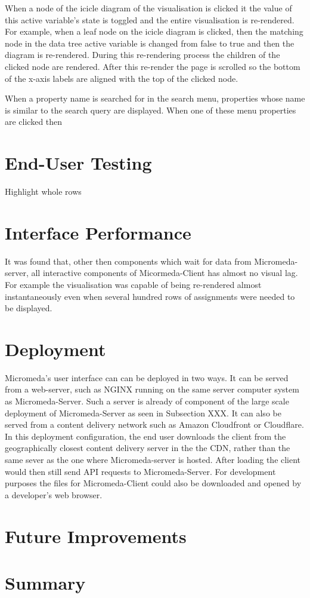 When a node of the icicle diagram of the visualisation is clicked it the value of this active variable's state is toggled and the entire visualisation is re-rendered. For example, when a leaf node on the icicle diagram is clicked, then the matching node in the data tree active variable is changed from false to true and then the diagram is re-rendered. During this re-rendering process the children of the clicked node are rendered. After this re-render the page is scrolled so the bottom of the x-axis labels are aligned with the top of the clicked node.

When a property name is searched for in the search menu, properties whose name is similar to the search query are displayed. When one of these menu properties are clicked then 

\section{End-User Testing}

Highlight whole rows

\section{Interface Performance}

It was found that, other then components which wait for data from Micromeda-server, all interactive components of Micormeda-Client has almost no visual lag. For example the visualisation was capable of being re-rendered almost instantaneously even when several hundred rows of assignments were needed to be displayed.

\section{Deployment}

Micromeda's user interface can can be deployed in two ways. It can be served from a web-server, such as NGINX running on the same server computer system as Micromeda-Server. Such a server is already of component of the large scale deployment of Micromeda-Server as seen in Subsection XXX. It can also be served from a content delivery network such as Amazon Cloudfront or Cloudflare. In this deployment configuration, the end user downloads the client from the geographically closest content delivery server in the the CDN, rather than the same sever as the one where Micromeda-server is hosted. After loading the client would then still send API requests to Micromeda-Server. For development purposes the files for Micromeda-Client could also be downloaded and opened by a developer's web browser.

\section{Future Improvements} \label{client-improvements}

\section{Summary} 